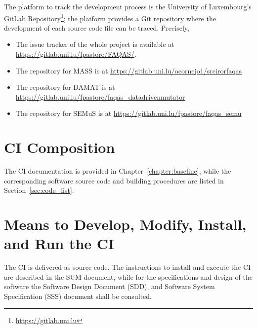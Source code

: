 The platform to track the development process is the University of Luxembourg's GitLab Repository\footnote{\url{https://gitlab.uni.lu}}; the platform provides a Git repository where the development of each source code file can be traced. Precisely,
\begin{itemize}
\item The issue tracker of the whole project is available at \url{https://gitlab.uni.lu/fpastore/FAQAS/}.
\item The repository for MASS is at \url{https://gitlab.uni.lu/ocornejo1/srcirorfaqas}
\item The repository for DAMAT is at \url{https://gitlab.uni.lu/fpastore/faqas_datadrivenmutator}
\item The repository for SEMuS is at \url{https://gitlab.uni.lu/fpastore/faqas_semu}
\end{itemize}


\section{CI Composition}

The CI documentation is provided in Chapter~\ref{chapter:baseline}, while the corresponding software source code and building procedures are listed in Section~\ref{sec:code_list}.

\section{Means to Develop, Modify, Install, and Run the CI}

The CI is delivered as source code. The instructions to install and execute the CI are described in the SUM document, while for the specifications and design of the software the Software Design Document (SDD), and Software System Specification (SSS) document shall be consulted.


